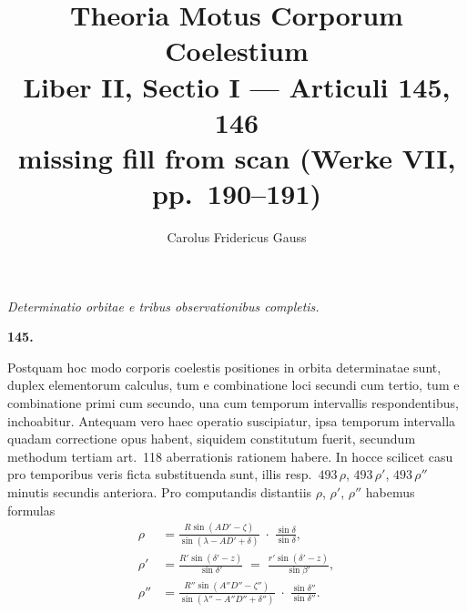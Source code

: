 \documentclass[11pt,a4paper]{article}
\title{Theoria Motus Corporum Coelestium\\[0.4em]
\large Liber II, Sectio I --- Articuli 145, 146\\
missing fill from scan (Werke VII, pp.\ 190--191)}
\author{Carolus Fridericus Gauss}
\date{}
\begin{document}
\maketitle
{}

\begin{center}\small\itshape
Determinatio orbitae e tribus observationibus completis.
\end{center}

\vspace{1em}

\begin{center}\textbf{145.}\end{center}

\medskip

Postquam hoc modo corporis coelestis positiones in orbita determinatae
sunt, duplex elementorum calculus, tum e combinatione loci secundi cum
tertio, tum e combinatione primi cum secundo, una cum temporum
intervallis respondentibus, inchoabitur. Antequam vero haec operatio
suscipiatur, ipsa temporum intervalla quadam correctione opus habent,
siquidem constitutum fuerit, secundum methodum tertiam art.~118
aberrationis rationem habere. In hocce scilicet casu pro temporibus veris
ficta substituenda sunt, illis resp.\ $493\,\rho$, $493\,\rho'$,
$493\,\rho''$ minutis secundis anteriora. Pro computandis distantiis
$\rho$, $\rho'$, $\rho''$ habemus formulas
\begin{align*}
  \rho   &= \frac{R\sin(A D' - \zeta)}{\sin(\lambda - A D' + \delta)}
          \;\cdot\; \frac{\sin\delta}{\sin\delta},\\[4pt]
  \rho'  &= \frac{R'\sin(\delta' - z)}{\sin\delta'}
          \;=\; \frac{r'\sin(\delta' - z)}{\sin\beta'},\\[4pt]
  \rho'' &= \frac{R''\sin(A''D'' - \zeta'')}{\sin(\lambda'' - A'' D'' + \delta'')}
          \;\cdot\; \frac{\sin\delta''}{\sin\delta''}.
\end{align*}
\end{document}

